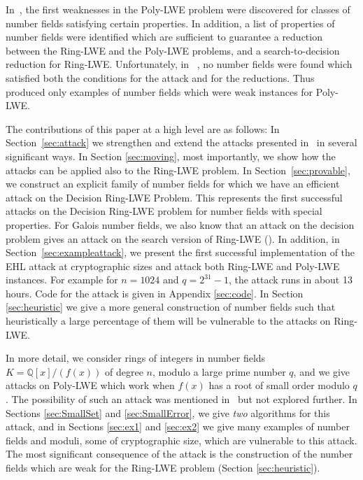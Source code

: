 \documentclass{llncs}
\newcommand{\QQ}{\mathbb{Q}}
\newcommand{\<}{\langle}
\renewcommand{\>}{\rangle}
\begin{document}
In~\cite{EHL}, the first weaknesses in the Poly-LWE problem were discovered for classes of number fields satisfying certain properties.  In addition, a list of properties of number fields were identified which are sufficient
to guarantee a reduction between the Ring-LWE and the Poly-LWE  problems, and a search-to-decision reduction for Ring-LWE.  Unfortunately, in ~\cite{EHL}, no number fields were found which satisfied both the conditions for the attack and for the reductions.  Thus ~\cite{EHL} produced only examples of number fields which were weak instances for Poly-LWE.

The contributions of this paper at a high level are as follows: In Section~\ref{sec:attack} we strengthen and extend the attacks presented in~\cite{EHL} in several significant ways.
In Section \ref{sec:moving}, most importantly, we show how the attacks can be applied also to the Ring-LWE problem. In Section~\ref{sec:provable}, we construct an explicit family of number fields for which we have an efficient attack on the Decision Ring-LWE Problem.
This represents the first successful attacks on the Decision Ring-LWE problem for number fields with special properties.
For Galois number fields, we also know that an attack on the decision problem gives an attack on the search version of Ring-LWE
(\cite{EHL}).
In addition, in Section~\ref{sec:exampleattack},  we present the first successful implementation of the EHL attack at cryptographic sizes and attack both Ring-LWE and Poly-LWE instances.  For example for $n=1024$ and $q=2^{31}-1$, the attack runs in about 13 hours.
Code for the attack is given in Appendix \ref{sec:code}. In Section \ref{sec:heuristic} we give a more general construction of number fields such that heuristically a large percentage of them will be vulnerable to the attacks on Ring-LWE.

In more detail, we consider rings of integers in number fields $K=\QQ[x]/(f(x))$ of degree $n$, modulo a large prime number $q$, and we give attacks on Poly-LWE which work when  $f(x)$ has a root of small order modulo $q$.
The possibility of such an attack was mentioned in~\cite{EHL} but not explored further.
In Sections \ref{sec:SmallSet} and \ref{sec:SmallError}, we give \emph{two} algorithms for this attack, and in Sections \ref{sec:ex1} and \ref{sec:ex2} we give many examples of number fields and moduli, some of cryptographic size, which are vulnerable to this attack.
 The most significant consequence of the attack is the construction of the number fields which are weak for the Ring-LWE problem (Section \ref{sec:heuristic}).
\end{document}
